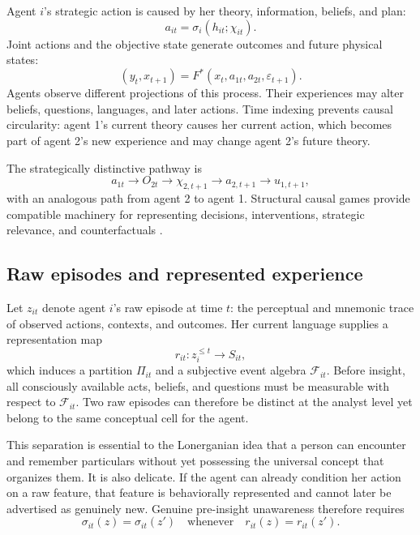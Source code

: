 \documentclass[11pt]{article}
\newcommand{\F}{\mathcal{F}}
\begin{document}
	Agent $i$'s strategic action is caused by her theory, information, beliefs, and plan:
	\begin{equation}
		a_{it}=\sigma_i(h_{it};\chi_{it}).
	\end{equation}
	Joint actions and the objective state generate outcomes and future physical states:
	\begin{equation}
		(y_t,x_{t+1})=F^*(x_t,a_{1t},a_{2t},\varepsilon_{t+1}).
	\end{equation}
	Agents observe different projections of this process.  Their experiences may alter beliefs, questions, languages, and later actions.  Time indexing prevents causal circularity: agent 1's current theory causes her current action, which becomes part of agent 2's new experience and may change agent 2's future theory.
	
	The strategically distinctive pathway is
	\begin{equation}
		a_{1t}
		\longrightarrow
		O_{2t}
		\longrightarrow
		\chi_{2,t+1}
		\longrightarrow
		a_{2,t+1}
		\longrightarrow
		u_{1,t+1},
	\end{equation}
	with an analogous path from agent 2 to agent 1.  Structural causal games provide compatible machinery for representing decisions, interventions, strategic relevance, and counterfactuals \citep{HammondEtAl2023}.
	
	\subsection{Raw episodes and represented experience}
	
	Let $z_{it}$ denote agent $i$'s raw episode at time $t$: the perceptual and mnemonic trace of observed actions, contexts, and outcomes.  Her current language supplies a representation map
	\begin{equation}
		r_{it}:z_i^{\le t}\longrightarrow S_{it},
	\end{equation}
	which induces a partition $\Pi_{it}$ and a subjective event algebra $\F_{it}$.  Before insight, all consciously available acts, beliefs, and questions must be measurable with respect to $\F_{it}$.  Two raw episodes can therefore be distinct at the analyst level yet belong to the same conceptual cell for the agent.
	
	This separation is essential to the Lonerganian idea that a person can encounter and remember particulars without yet possessing the universal concept that organizes them.  It is also delicate.  If the agent can already condition her action on a raw feature, that feature is behaviorally represented and cannot later be advertised as genuinely new.  Genuine pre-insight unawareness therefore requires
	\begin{equation}
		\sigma_{it}(z)=\sigma_{it}(z')
		\quad\text{whenever}\quad
		r_{it}(z)=r_{it}(z').
	\end{equation}
	
\end{document}
